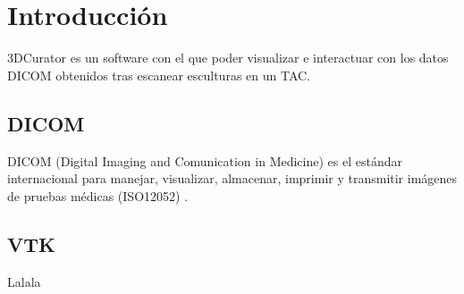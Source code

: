 \chapter{Introducción}
3DCurator es un software con el que poder visualizar e interactuar con los datos DICOM obtenidos tras escanear esculturas en un TAC.

\section{DICOM}
DICOM (Digital Imaging and Comunication in Medicine) es el estándar internacional para manejar, visualizar, almacenar, imprimir y transmitir imágenes de pruebas médicas (ISO12052) \cite{about_dicom}.

\section{VTK}
Lalala \cite{intro_medical_vtk_bioimage}
